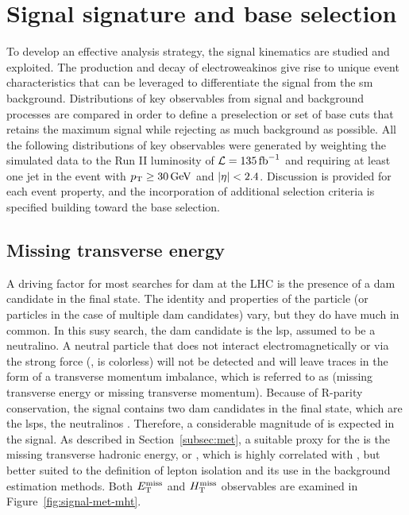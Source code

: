 \clearpage
\section{Signal signature and base selection}
\label{sec:signal-signature}

To develop an effective analysis strategy, the signal kinematics are studied and exploited. The production and decay of electroweakinos give rise to unique event characteristics that can be leveraged to differentiate the signal from the \gls{sm} background. Distributions of key observables from signal and background processes are compared in order to define a preselection or set of base cuts that retains the maximum signal while rejecting as much background as possible. All the following distributions of key observables were generated by weighting the simulated data to the Run II luminosity of $\mathcal{L} = 135 \mbox{\ensuremath{\,\text{fb}^{-1}}}$ and requiring at least one jet in the event with $p_{\mathrm{T}} \geq 30\,\text{Ge\hspace{-.08em}V}$ and $\abs{\eta}<2.4$. Discussion is provided for each event property, and the incorporation of additional selection criteria is specified building toward the base selection. 

\subsection{Missing transverse energy}
\label{subsec:signal-met-mht}

A driving factor for most searches for \gls{dam} at the LHC is the presence of a \gls{dam} candidate in the final state. The identity and properties of the particle (or particles in the case of multiple \gls{dam} candidates) vary, but they do have much in common. In this \gls{susy} search, the \gls{dam} candidate is the \gls{lsp}, assumed to be a neutralino. A neutral particle that does not interact electromagnetically or via the strong force (\ie, is colorless) will not be detected and will leave traces in the form of a transverse momentum imbalance, which is referred to as \MET (missing transverse energy or missing transverse momentum). Because of R-parity conservation, the signal contains two \gls{dam} candidates in the final state, which are the \glspl{lsp}, the neutralinos \neuto. Therefore, a considerable magnitude of \MET is expected in the signal. As described in Section~\ref{subsec:met}, a suitable proxy for the \MET is the missing transverse hadronic energy, or \mht, which is highly correlated with \MET, but better suited to the definition of lepton isolation and its use in the background estimation methods. Both $E_{\mathrm{T}}^{\text{miss}}$ and $H_{\mathrm{T}}^{\text{miss}}$ observables are examined in Figure~\ref{fig:signal-met-mht}.


